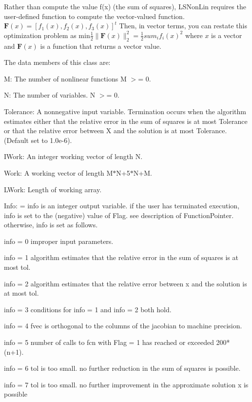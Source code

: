Rather than compute the value f(x) (the sum of squares), L\+S\+Non\+Lin requires the user-\/defined function to compute the vector-\/valued function. $ \textbf{F}(x) = [f_1(x), f_2(x), f_3(x)]^{t} $ Then, in vector terms, you can restate this optimization problem as $ \mbox{min} \frac{1}{2} \| \textbf{F}(x) \|_2^2 = \frac{1}{2} sum_i f_i(x)^2 $ where $x$ is a vector and $\textbf{F}(x)$ is a function that returns a vector value.

The data members of this class are\+:


\begin{DoxyItemize}
\item M\+: The number of nonlinear functions M $>$= 0.
\item N\+: The number of variables. N $>$= 0.
\item Tolerance\+: A nonnegative input variable. Termination occurs when the algorithm estimates either that the relative error in the sum of squares is at most Tolerance or that the relative error between X and the solution is at most Tolerance. (Default set to 1.\+0e-\/6).
\item I\+Work\+: An integer working vector of length N.
\item Work\+: A working vector of length M$\ast$\+N+5$\ast$\+N+\+M.
\item L\+Work\+: Length of working array.
\item Info\+: = info is an integer output variable. if the user has terminated execution, info is set to the (negative) value of Flag. see description of Function\+Pointer. otherwise, info is set as follows. \begin{DoxyVerb}info = 0  improper input parameters.

info = 1  algorithm estimates that the relative error
          in the sum of squares is at most tol.

info = 2  algorithm estimates that the relative error
          between x and the solution is at most tol.

info = 3  conditions for info = 1 and info = 2 both hold.

info = 4  fvec is orthogonal to the columns of the
          jacobian to machine precision.

info = 5  number of calls to fcn with Flag = 1 has 
      reached or exceeded 200*(n+1).

info = 6  tol is too small. no further reduction in
          the sum of squares is possible.

info = 7  tol is too small. no further improvement in
          the approximate solution x is possible
\end{DoxyVerb}

\end{DoxyItemize}

